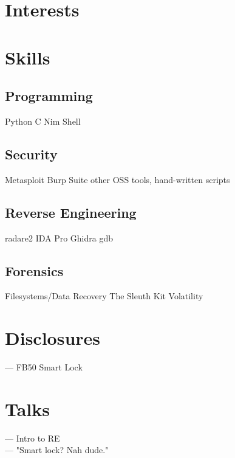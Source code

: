 \documentclass[]{resume-openfont}
\begin{document}
\begin{minipage}[t]{0.33\textwidth}
\section{Interests}
\sectionsep


\vspace{-2mm} %

\section{Skills}
\subsection{Programming}
Python \textbullet{} C \textbullet{} Nim \textbullet{} Shell
\sectionsep
\subsection{Security}
Metasploit \textbullet{} Burp Suite \textbullet{} other OSS tools, hand-written scripts
\sectionsep
\subsection{Reverse Engineering}
radare2 \textbullet{} IDA Pro \textbullet{} Ghidra \textbullet{} gdb
\sectionsep
\subsection{Forensics}
Filesystems/Data Recovery \textbullet{} The Sleuth Kit \textbullet{} Volatility
\sectionsep


\section{Disclosures}
{\bf{}} — FB50 Smart Lock

\section{Talks}
{\bf{}} — Intro to RE \\
{\bf{}} — "Smart lock? Nah dude."
%
%

\end{minipage} 
\end{document}

